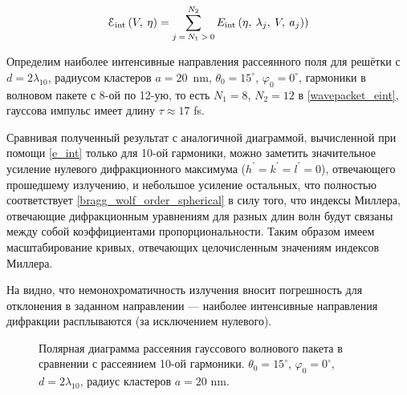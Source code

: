 
    \begin{equation}
        \EuScript{E}_{\textrm{int}} \left(V, \:\eta\right) = \sum\limits_{j\:=\:N_1\:>\:0}^{N_2}{E_{\textrm{int}} \left( \eta,\:\lambda_{j}, \:V, \:a_j) \right)}
        \label{wavepacket_eint}
    \end{equation}

Определим наиболее интенсивные направления рассеянного поля для решётки с $d = 2\lambda_{10}$, радиусом кластеров $a = 20$~nm, $\theta_0 = 15^\circ$, $\varphi_0 = 0^\circ$, гармоники в волновом пакете с 8-ой по 12-ую, то есть $N_1 = 8$, $N_2 = 12$ в \autoref{wavepacket_eint}, гауссова импульс имеет длину $\tau \approx 17$ fs. 

Сравнивая полученный результат с аналогичной диаграммой, вычисленной при помощи \autoref{e_int} только для 10-ой гармоники, можно заметить значительное усиление нулевого дифракционного максимума ($h^\prime = k^\prime = l^\prime = 0$), отвечающего прошедшему излучению, и небольшое усиление остальных, что полностью соответствует \autoref{bragg_wolf_order_spherical} в силу того, что индексы Миллера, отвечающие дифракционным уравнениям для разных длин волн будут связаны между собой коэффициентами пропорциональности. Таким образом имеем масштабирование кривых, отвечающих целочисленным значениям индексов Миллера.

На  видно, что немонохроматичность излучения вносит погрешность для отклонения в заданном направлении --- наиболее интенсивные направления дифракции расплываются (за исключением нулевого).


    \begin{figure}[ht]
        \hfil
        \caption{Полярная диаграмма рассеяния гауссового волнового пакета в сравнении с рассеянием 10-ой гармоники. $\theta_0 = 15^\circ$, $\varphi_0 = 0^\circ$, $d = 2\lambda_{10}$, радиус кластеров $a = 20$ nm.}\label{wavepacket1:image}
    \end{figure}